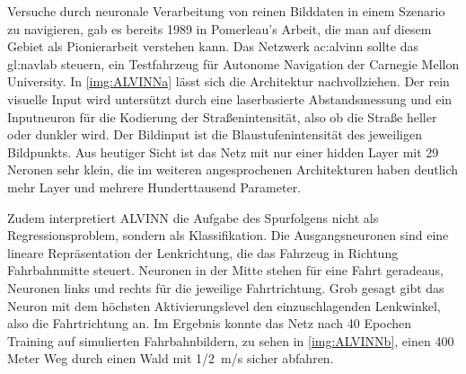Versuche durch neuronale Verarbeitung von reinen Bilddaten in einem Szenario zu navigieren, gab es bereits 1989 in Pomerleau's Arbeit, die man auf diesem Gebiet als Pionierarbeit verstehen kann\cite{pomerleau1989alvinn}.
Das Netzwerk \gls{ac:alvinn} sollte das \gls{gl:navlab} steuern, ein Testfahrzeug für Autonome Navigation der Carnegie Mellon University.
In \ref{img:ALVINNa} lässt sich die Architektur nachvollziehen. 
Der rein visuelle Input wird untersützt durch eine laserbasierte Abstandsmessung und ein Inputneuron für die Kodierung der \glqq Straßenintensität\grqq{}, also ob die Straße heller oder dunkler wird. Der Bildinput ist die Blaustufenintensität des jeweiligen Bildpunkts.
Aus heutiger Sicht ist das Netz mit nur einer hidden Layer mit 29 Neronen sehr klein, die im weiteren angesprochenen Architekturen haben deutlich mehr Layer und mehrere Hunderttausend Parameter. 

Zudem interpretiert ALVINN die Aufgabe des Spurfolgens nicht als Regressionsproblem, sondern als Klassifikation. Die Ausgangsneuronen sind eine lineare Repräsentation der Lenkrichtung, die das Fahrzeug in Richtung Fahrbahnmitte steuert. Neuronen in der Mitte stehen für eine Fahrt geradeaus, Neuronen links und rechts für die jeweilige Fahrtrichtung.
Grob gesagt gibt das Neuron mit dem höchsten Aktivierungslevel den einzuschlagenden Lenkwinkel, also die Fahrtrichtung an.
Im Ergebnis konnte das Netz nach 40 Epochen Training auf simulierten Fahrbahnbildern, zu sehen in \ref{img:ALVINNb}, einen 400 Meter Weg durch einen Wald mit \SI{1/2}{\meter/\second} sicher abfahren.


